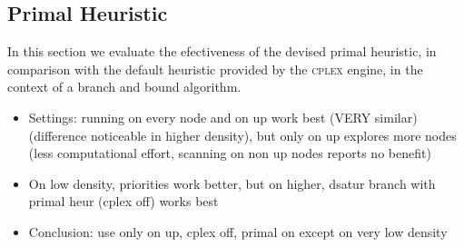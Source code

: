 
\subsection{Primal Heuristic}
\label{subsec:resultsprimal}

In this section we evaluate the efectiveness of the devised primal heuristic, in comparison with the default heuristic provided by the \textsc{cplex} engine, in the context of a branch and bound algorithm. 

\begin{itemize}
\item{Settings: running on every node and on up work best (VERY similar) (difference noticeable in higher density), but only on up explores more nodes (less computational effort, scanning on non up nodes reports no benefit)}
\item{On low density, priorities work better, but on higher, dsatur branch with primal heur (cplex off) works best}
\item{Conclusion: use only on up, cplex off, primal on except on very low density}
\end{itemize}